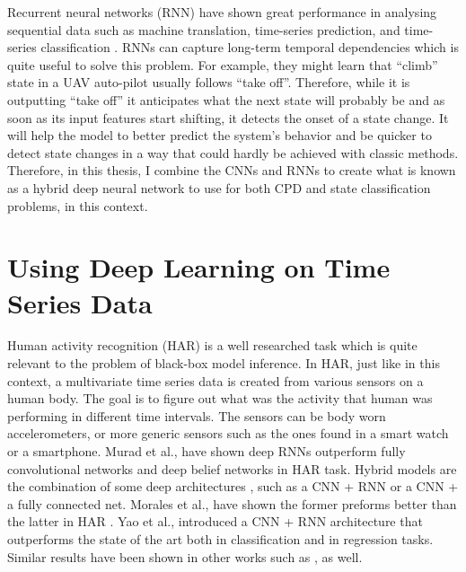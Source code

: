 Recurrent neural networks (RNN) have shown great performance in analysing sequential data such as machine translation, time-series prediction, and time-series classification \cite{cho2014learning, zhang2000predicting, wang2017time, murad2017deep, yang2015deep, Ordonez2016}. RNNs can capture long-term temporal dependencies which is quite useful to solve this problem. \cite{Che2018} For example, they might learn that ``climb'' state in a UAV auto-pilot usually follows ``take off''. Therefore, while it is outputting ``take off'' it anticipates what the next state will probably be and as soon as its input features start shifting, it detects the onset of a state change. It will help the model to better predict the system's behavior and be quicker to detect state changes in a way that could hardly be achieved with classic methods.
Therefore, in this thesis, I combine the CNNs and RNNs to create what is known as a hybrid deep neural network \cite{wang2017time} to use for both CPD and state classification problems, in this context.  


\section{Using Deep Learning on Time Series Data} \label{sec:related_work_har}
Human activity recognition (HAR) is a well researched task which is quite relevant to the problem of black-box model inference. In HAR, just like in this context, a multivariate time series data is created from various sensors on a human body. 
The goal is to figure out what was the activity that human was performing in different time intervals. The sensors can be body worn accelerometers, or more generic sensors such as the ones found in a smart watch or a smartphone. 
Murad et al., \cite{murad2017deep} have shown deep RNNs outperform fully convolutional networks and deep belief networks in HAR task.
Hybrid models are the combination of some deep architectures \cite{wang2019deep}, such as a CNN + RNN or a CNN + a fully connected net. Morales et al., have shown the former preforms better than the latter in HAR \cite{morales2016deep}. Yao et al., \cite{deepsense} introduced a CNN + RNN architecture that outperforms the state of the art both in classification and in regression tasks. Similar results have been shown in other works such as \cite{Ordonez2016, singh2017transforming, zheng2016exploiting}, as well.

